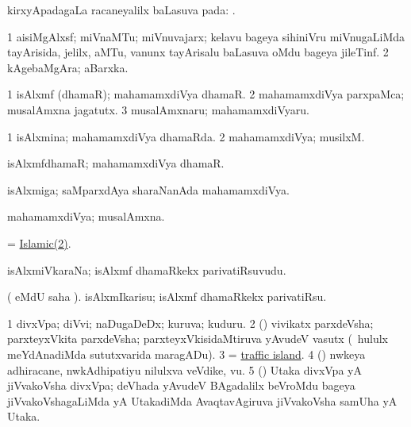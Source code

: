 \bentry
{}
\gl{\uparx}
\bmng
kirxyApadagaLa racaneyalilx baLasuva pada: . 
\emng
\eentry


\bentry
{}
\gl{\nA}
\bmng
\bnum
\num{1} aisiMgAlxsf; miVnaMTu; miVnuvajarx; kelavu bageya sihiniVru miVnugaLiMda tayArisida, jelilx, aMTu, \mo vanunx tayArisalu baLasuva oMdu bageya jileTinf. 
\num{2} kAgebaMgAra; aBarxka. 
\enum
\emng
\eentry

\bentry
{}
\gl{\nA}
\bmng
\bnum
\num{1} isAlxmf (dhamaR); mahamamxdiVya dhamaR. 
\num{2} mahamamxdiVya parxpaMca; musalAmxna jagatutx. 
\num{3} musalAmxnaru; mahamamxdiVyaru. 
\enum
\emng
\eentry

\bentry
{}
\gl{\gu}
\bmng
\bnum
\num{1} isAlxmina; mahamamxdiVya dhamaRda. 
\hypertarget{Islamic(2)}{} 
\num{2} mahamamxdiVya; musilxM. 
\enum
\emng
\eentry

\bentry
{}
\gl{\nA}
\bmng
isAlxmfdhamaR; mahamamxdiVya dhamaR. 
\emng
\eentry

\bentry
{}
\gl{\nA}
\bmng
isAlxmiga; saMparxdAya sharaNanAda mahamamxdiVya. 
\emng
\eentry

\bentry
{}
\gl{\nA}
\bmng
mahamamxdiVya; musalAmxna. 
\emng
\eentry

\bentry
{}
\gl{\gu}
\bmng
= \hyperlink{Islamic(2)}{Islamic(2)}. 
\emng
\eentry

\bentry
{}
\gl{\nA}
\bmng
isAlxmiVkaraNa; isAlxmf dhamaRkekx parivatiRsuvudu. 
\emng
\eentry

\bentry
{}
\gl{\sakirx}
\bmng
( eMdU saha \parx). isAlxmIkarisu; isAlxmf dhamaRkekx parivatiRsu. 
\emng
\eentry

\bentry
{}
\gl{\nA}
\bmng
\bnum
\num{1} divxVpa; diVvi; naDugaDeDx; kuruva; kuduru. 
\num{2} (\rUpa) vivikatx parxdeVsha; parxteyxVkita parxdeVsha; parxteyxVkisidaMtiruva yAvudeV vasutx (\kanmu\ hululx meYdAnadiMda sututxvarida maragADu). 
\num{3} = \hyperref{kandict_t.pdf}{T}{traffic island}{traffic island}. 
\num{4} (\nw) nwkeya adhiracane, nwkAdhipatiyu nilulxva veVdike, \mo vu. 
\num{5} (\shavi) Utaka divxVpa yA jiVvakoVsha divxVpa; deVhada yAvudeV BAgadalilx beVroMdu bageya jiVvakoVshagaLiMda yA UtakadiMda AvaqtavAgiruva jiVvakoVsha samUha yA Utaka. 
\enum
\emng
\eentry

